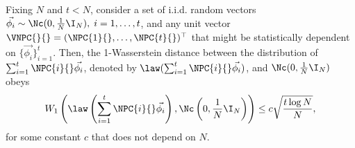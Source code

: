 \begin{lemma}
    \label{lm:Gap_with_Gaussian_vector}
    Fixing $N$ and $t < N$, consider a set of i.i.d. random vectors $\Vec{\phi_i} \sim \Nc(0,\frac{1}{N}\I_N),\; i=1, \ldots, t$, and any unit vector $\VNPC{}{} = (\NPC{1}{}, \ldots, \NPC{t}{})^\top$ that might be statistically dependent on $\{\Vec{\phi_i}\}_{i=1}^t$. Then, the 1-Wasserstein distance between the distribution of $\sum_{i=1}^t \NPC{i}{} \Vec{\phi_i}$, denoted by $\law(\sum_{i=1}^t \NPC{i}{} \Vec{\phi_i})$, and $\Nc(0,\frac{1}{N}\I_N)$ obeys
    \begin{equation*}
        W_1\left(\law\left(\sum_{i=1}^t \NPC{i}{} \Vec{\phi_i}\right),\Nc\left(0,\frac{1}{N}\I_N\right)\right) \leq c \sqrt{\frac{t \log N}{N}},
    \end{equation*}
    for some constant $c$ that does not depend on $N$.
\end{lemma}


